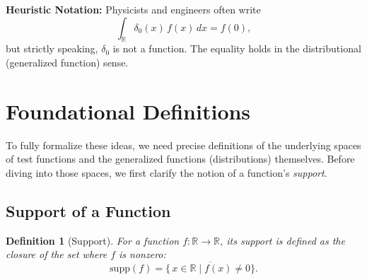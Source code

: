 \documentclass[11pt,openany]{book}
\newtheorem{definition}{Definition}[section]
\begin{document}
\textbf{Heuristic Notation:} Physicists and engineers often write
\[
\int_{\mathbb{R}} \delta_0(x)\,f(x)\,dx = f(0),
\]
but strictly speaking, \(\delta_0\) is not a function. The equality holds in the distributional (generalized function) sense.
\newpage
\section{Foundational Definitions}

To fully formalize these ideas, we need precise definitions of the underlying spaces of test functions and the generalized functions (distributions) themselves. Before diving into those spaces, we first clarify the notion of a function’s \textit{support}.

\subsection{Support of a Function}

\begin{definition}[Support]
For a function \(f: \mathbb{R} \to \mathbb{R}\), its \emph{support} is defined as the closure of the set where \(f\) is nonzero:
\[
\mathrm{supp}(f)
= \overline{\{\, x \in \mathbb{R} \mid f(x) \neq 0 \}}.
\]
\end{definition}
\end{document}
